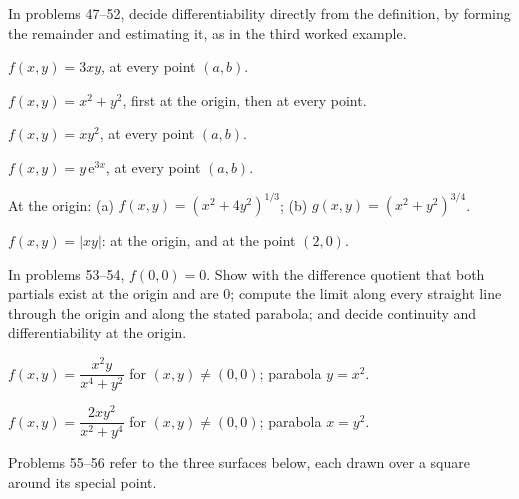 In problems 47--52, decide differentiability directly from the definition,
by forming the remainder and estimating it, as in the third worked example.

\begin{problems}[resume]
  \item $f(x,y)=3xy$, at every point $(a,b)$.
  \item $f(x,y)=x^{2}+y^{2}$, first at the origin, then at every point.
  \item $f(x,y)=xy^{2}$, at every point $(a,b)$.
  \item $f(x,y)=y\,\mathrm{e}^{3x}$, at every point $(a,b)$.
  \item At the origin: (a) $f(x,y)=(x^{2}+4y^{2})^{1/3}$;
        (b) $g(x,y)=(x^{2}+y^{2})^{3/4}$.
  \item $f(x,y)=|xy|$: at the origin, and at the point $(2,0)$.
\end{problems}

In problems 53--54, $f(0,0)=0$. Show with the difference quotient that both
partials exist at the origin and are $0$; compute the limit along every
straight line through the origin and along the stated parabola; and decide
continuity and differentiability at the origin.

\begin{problems}[resume]
  \item $f(x,y)=\dfrac{x^{2}y}{x^{4}+y^{2}}$ for $(x,y)\neq(0,0)$; parabola
        $y=x^{2}$.
  \item $f(x,y)=\dfrac{2xy^{2}}{x^{2}+y^{4}}$ for $(x,y)\neq(0,0)$;
        parabola $x=y^{2}$.
\end{problems}

Problems 55--56 refer to the three surfaces below, each drawn over a square
around its special point.

\begin{gallery}
\hfill
{}\hfill
{}
\end{gallery}

